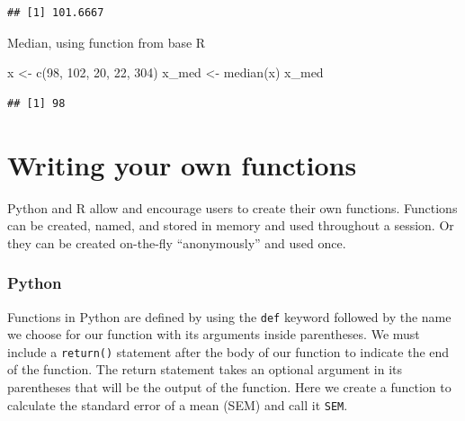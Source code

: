 \documentclass[
]{book}
\newenvironment{Shaded}{\begin{snugshade}}{\end{snugshade}}
\newcommand{\DecValTok}[1]{\textcolor[rgb]{0.00,0.00,0.81}{#1}}
\newcommand{\FunctionTok}[1]{\textcolor[rgb]{0.00,0.00,0.00}{#1}}
\newcommand{\NormalTok}[1]{#1}
\newcommand{\OtherTok}[1]{\textcolor[rgb]{0.56,0.35,0.01}{#1}}
\begin{document}
\begin{verbatim}
## [1] 101.6667
\end{verbatim}

Median, using function from base R

\begin{Shaded}
\begin{Highlighting}[]
\NormalTok{x }\OtherTok{\textless{}{-}} \FunctionTok{c}\NormalTok{(}\DecValTok{98}\NormalTok{, }\DecValTok{102}\NormalTok{, }\DecValTok{20}\NormalTok{, }\DecValTok{22}\NormalTok{, }\DecValTok{304}\NormalTok{)}
\NormalTok{x\_med }\OtherTok{\textless{}{-}} \FunctionTok{median}\NormalTok{(x)}
\NormalTok{x\_med}
\end{Highlighting}
\end{Shaded}

\begin{verbatim}
## [1] 98
\end{verbatim}

\hypertarget{writing-your-own-functions}{%
\section{Writing your own functions}\label{writing-your-own-functions}}

Python and R allow and encourage users to create their own functions. Functions can be created, named, and stored in memory and used throughout a session. Or they can be created on-the-fly ``anonymously'' and used once.

\hypertarget{python-7}{%
\subsubsection*{Python}\label{python-7}}

Functions in Python are defined by using the \texttt{def} keyword followed by the name we choose for our function with its arguments inside parentheses. We must include a \texttt{return()} statement after the body of our function to indicate the end of the function. The return statement takes an optional argument in its parentheses that will be the output of the function. Here we create a function to calculate the standard error of a mean (SEM) and call it \texttt{SEM}.
\end{document}

